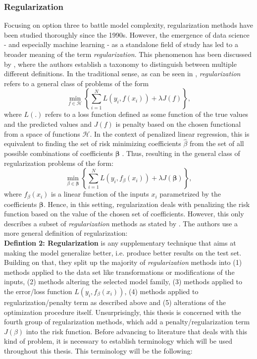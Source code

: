 \documentclass[12pt,a4paper]{article}
\begin{document}
\subsubsection{Regularization}

Focusing on option three to battle model complexity, regularization methods have been studied thoroughly since the 1990s. However, the emergence of data science - and especially machine learning - as a standalone field of study has led to a broader meaning of the term \textit{regularization}. This phenomenon has been discussed by \textcite{Taxonomy2017}, where the authors establish a taxonomy to distinguish between multiple different definitions. In the traditional sense, as can be seen in \textcite[167--170]{ESL2009}, \textit{regularization} refers to a general class of problems of the form
\[
\underset{f \in \mathcal{H}}{\min}\left\{\sum_{i=1}^N L(y_i, f(x_i)) + \lambda{J}(f)\right\},
\]
where $L(.)$ refers to a loss function defined as some function of the true values and the predicted values and $J(f)$ is penalty based on the chosen functional from a space of functions $\mathcal{H}$. In the context of penalized linear regression, this is equivalent to finding the set of risk minimizing coefficients $\hat{\beta}$ from the set of all possible combinations of coefficients $\mathbf{\beta}$ \parencite{ESL2009}. Thus, resulting in the general class of regularization problems of the form:
\[
\underset{\beta \in \boldsymbol{\beta}}{\min}\left\{\sum_{i=1}^N L(y_i, f_\beta(x_i)) + \lambda{J}(\mathbf{\beta})\right\},
\]
where $f_\beta(x_i)$ is a linear function of the inputs $x_i$ parametrized by the coefficients $\mathbf{\beta}$. Hence, in this setting, regularization deals with penalizing the risk function based on the value of the chosen set of coefficients. However, this only describes a subset of \textit{regularization} methods as stated by \textcite{Taxonomy2017}. The authors use a more general definition of regularization:\\

\textbf{Defintion 2: Regularization} is any supplementary technique that aims at making the model generalize better, i.e. produce better results on the test set.\\

Building on that, they split up the majority of \textit{regularization} methods into  (1) methods applied to the data set like transformations or modifications of the inputs, (2) methods altering the selected model family, (3) methods applied to the error/loss function $L(y_i, f_\beta(x_i))$, (4) methods applied to regularization/penalty term as described above and (5) alterations of the optimization procedure itself. Unsurprisingly, this thesis is concerned with the fourth group of regularization methods, which add a penalty/regularization term $J(\beta)$ into the risk function. Before advancing to literature that deals with this kind of problem, it is necessary to establish terminology which will be used throughout this thesis. This terminology will be the following:
\end{document}
